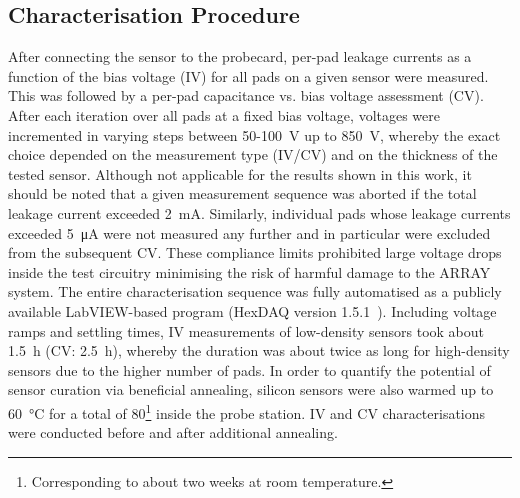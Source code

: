 \subsection{Characterisation Procedure}
\label{subsec:setup_procedure}
After connecting the sensor to the probecard, per-pad leakage currents as a function of the bias voltage (IV) for all pads on a given sensor were measured.
This was followed by a per-pad capacitance vs. bias voltage assessment (CV).
After each iteration over all pads at a fixed bias voltage, voltages were incremented in varying steps between 50-\SI{100}{\volt} up to \SI{850}{\volt}, whereby the exact choice depended on the measurement type (IV/CV) and on the thickness of the tested sensor.
Although not applicable for the results shown in this work, it should be noted that a given measurement sequence was aborted if the total leakage current exceeded \SI{2}{\milli\ampere}.
Similarly, individual pads whose leakage currents exceeded \SI{5}{\micro\ampere} were not measured any further and in particular were excluded from the subsequent CV.
These compliance limits prohibited large voltage drops inside the test circuitry minimising the risk of harmful damage to the ARRAY system.
The entire characterisation sequence was fully automatised as a publicly available LabVIEW-based program (HexDAQ version 1.5.1~\cite{labview_hexdaq}).
Including voltage ramps and settling times, IV measurements of low-density sensors took about \SI{1.5}{\hour} (CV: \SI{2.5}{\hour}), whereby the duration was about twice as long for high-density sensors due to the higher number of pads.
In order to quantify the potential of sensor curation via beneficial annealing, silicon sensors were also warmed up to \SI{60}{\celsius} for a total of \SI{80}{\min}\footnote{Corresponding to about two weeks at room temperature.} inside the probe station.
IV and CV characterisations were conducted before and after additional annealing.